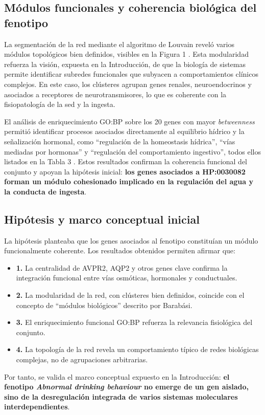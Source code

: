 \subsection{Módulos funcionales y coherencia biológica del fenotipo}
La segmentación de la red mediante el algoritmo de Louvain reveló varios módulos topológicos bien definidos, visibles en la Figura 1 . Esta modularidad refuerza la visión, expuesta en la Introducción, de que la biología de sistemas permite identificar subredes funcionales que subyacen a comportamientos clínicos complejos. En este caso, los clústeres agrupan genes renales, neuroendocrinos y asociados a receptores de neurotransmisores, lo que es coherente con la fisiopatología de la sed y la ingesta.

El análisis de enriquecimiento GO:BP sobre los 20 genes con mayor \textit{betweenness} permitió identificar procesos asociados directamente al equilibrio hídrico y la señalización hormonal, como “regulación de la homeostasis hídrica”, “vías mediadas por hormonas” y “regulación del comportamiento ingestivo”, todos ellos listados en la Tabla 3 . Estos resultados confirman la coherencia funcional del conjunto y apoyan la hipótesis inicial: \textbf{los genes asociados a HP:0030082 forman un módulo cohesionado implicado en la regulación del agua y la conducta de ingesta}.

\subsection{Hipótesis y marco conceptual inicial}
La hipótesis planteaba que los genes asociados al fenotipo constituían un módulo funcionalmente coherente. Los resultados obtenidos permiten afirmar que:
\begin{itemize}
    \item \textbf{1. }La centralidad de AVPR2, AQP2 y otros genes clave confirma la integración funcional entre vías osmóticas, hormonales y conductuales.
    \item  \textbf{2. }La modularidad de la red, con clústeres bien definidos, coincide con el concepto de “módulos biológicos” descrito por Barabási.
    \item \textbf{3. }El enriquecimiento funcional GO:BP refuerza la relevancia fisiológica del conjunto.
    \item \textbf{4. }La topología de la red revela un comportamiento típico de redes biológicas complejas, no de agrupaciones arbitrarias.
\end{itemize}
Por tanto, se valida el marco conceptual expuesto en la Introducción: \textbf{el fenotipo \textit{Abnormal drinking behaviour} no emerge de un gen aislado, sino de la desregulación integrada de varios sistemas moleculares interdependientes}.